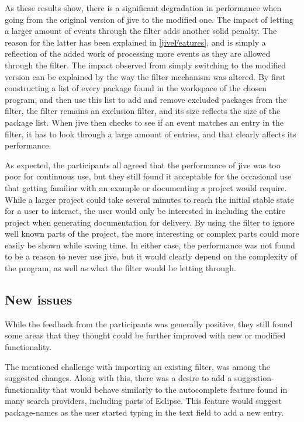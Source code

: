 As these results show, there is a significant degradation in performance when going from the original version of \gls{jive} to the modified one.
The impact of letting a larger amount of events through the filter adds another solid penalty.
The reason for the latter has been explained in \cref{jiveFeatures}, and is simply a reflection of the added work of processing more events as they are allowed through the filter.
The impact observed from simply switching to the modified version can be explained by the way the filter mechanism was altered.
By first constructing a list of every package found in the workspace of the chosen program, and then use this list to add and remove excluded packages from the filter, the filter remains an exclusion filter, and its size reflects the size of the package list.
When \gls{jive} then checks to see if an event matches an entry in the filter, it has to look through a large amount of entries, and that clearly affects its performance.

As expected, the participants all agreed that the performance of \gls{jive} was too poor for continuous use, but they still found it acceptable for the occasional use that getting familiar with an example or documenting a project would require.
While a larger project could take several minutes to reach the initial stable state for a user to interact, the user would only be interested in including the entire project when generating documentation for delivery.
By using the filter to ignore well known parts of the project, the more interesting or complex parts could more easily be shown while saving time.
In either case, the performance was not found to be a reason to never use \gls{jive}, but it would clearly depend on the complexity of the program, as well as what the filter would be letting through.

\subsection{New issues}\label{jiveEvalIssues}
While the feedback from the participants was generally positive, they still found some areas that they thought could be further improved with new or modified functionality.

The mentioned challenge with importing an existing filter, was among the suggested changes.
Along with this, there was a desire to add a suggestion-functionality that would behave similarly to the autocomplete feature found in many search providers, including parts of Eclipse.
This feature would suggest package-names as the user started typing in the text field to add a new entry.

